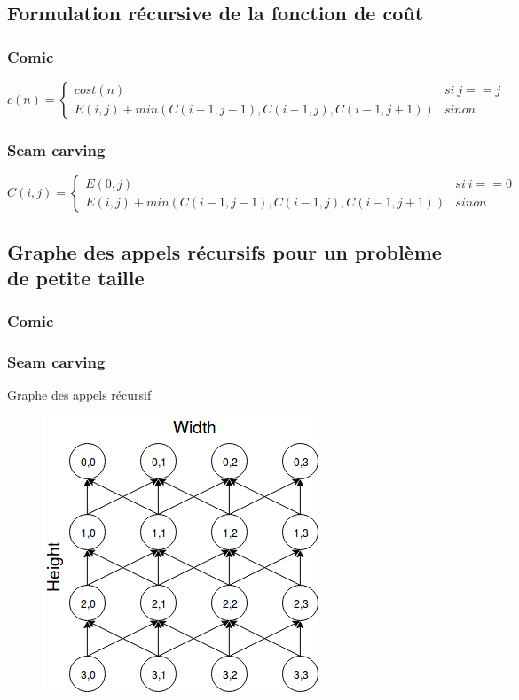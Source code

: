 \documentclass[10pt]{article}
\begin{document}
\subsection{Formulation récursive de la fonction de coût}
\subsubsection{Comic}
$$
c(n) = \left\{
	\begin{array}{ll}
		cost(n) & si\ j==j \\
		E(i,j)+min(C(i-1,j-1),C(i-1,j),C(i-1,j+1)) & sinon
	\end{array}
\right.
$$
\subsubsection{Seam carving}
$$
C(i,j) = \left\{
	\begin{array}{ll}
		E(0,j) & si\ i==0 \\
		E(i,j)+min(C(i-1,j-1),C(i-1,j),C(i-1,j+1)) & sinon
	\end{array}
\right.
$$

\subsection{Graphe des appels récursifs pour un problème de petite taille}
\subsubsection{Comic}
\subsubsection{Seam carving}
Graphe des appels récursif
 \begin{figure} [h]
      \centering
      \includegraphics[scale=0.5]{GrapheSeamCarving.png}
   \end{figure}
\end{document}

